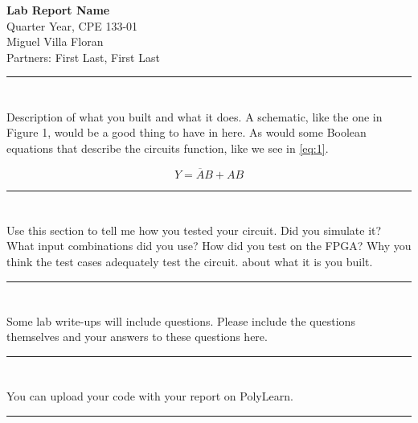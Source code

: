 \documentclass[12pt, letterpaper]{article}
\begin{document}
\begin{center}
  \large{\textbf{Lab Report Name}} \\[10pt]
  \large{Quarter Year, CPE 133-01} \\[5pt]
  \large{Miguel Villa Floran} \\[5pt]
  \large{Partners: First Last, First Last}
\end{center}

\noindent\rule{\textwidth}{0.5pt}

\section*{}

Description of what you built and what it does. A schematic, like the one in Figure 1, would be a good thing to have in here. As would some Boolean equations that describe the circuits function, like we see in \ref{eq:1}.

\begin{equation}
  Y = \overline{A}B + AB
\end{equation}

\noindent\rule{\textwidth}{0.5pt}

\section*{}

\noindent Use this section to tell me how you tested your circuit. Did you simulate it? What input combinations did 
you use? How did you test on the FPGA? Why you think the test cases adequately test the circuit.
about what it is you built.

\noindent\rule{\textwidth}{0.5pt}

\section*{}

\noindent Some lab write-ups will include questions.  Please include the questions themselves and your answers to 
these questions here.   

\noindent\rule{\textwidth}{0.5pt}

\section*{}

\noindent You can upload your code with your report on PolyLearn.

\noindent\rule{\textwidth}{0.5pt}

\printbibliography[title={\centering References}]
\end{document}
